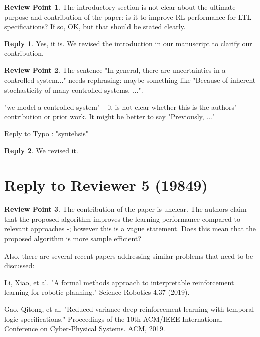 \documentclass[10 pt, dvipdfmx]{article}
\theoremstyle{definition}
\newtheorem{review point}{Review Point}[section]
\newtheorem*{reply}{Reply}
\begin{document}
\begin{review point}
  The introductory section is not clear about the ultimate purpose and
contribution of the paper: is it to improve RL performance for LTL
specifications? If so, OK, but that should be stated clearly.
\end{review point}

\begin{reply}
  Yes, it is. We revised the introduction in our manuscript to clarify our contribution.
\end{reply}

\begin{review point}
  The sentence "In general, there are uncertainties in a controlled
system..." needs rephrasing: maybe something like "Because of inherent
stochasticity of many controlled systems, ...".

"we model a controlled system" -- it is not clear whether this is the
authors' contribution or prior work. It might be better to say
"Previously, ..."

Reply to Typo : "syntehsis"
\end{review point}

\begin{reply}
  We revised it.
\end{reply}

\section{Reply to Reviewer 5 (19849)}

\begin{review point}
  The contribution of the paper is unclear. The authors claim that the
proposed algorithm improves the learning performance compared to
relevant approaches \cite{Hahn2019}-\cite{BWZP2019}; however this is a vague statement. Does
this mean that the proposed algorithm is more sample efficient?

Also, there are several recent papers addressing similar problems that
need to be discussed:

Li, Xiao, et al. "A formal methods approach to interpretable
reinforcement learning for robotic planning." Science Robotics 4.37
(2019).

Gao, Qitong, et al. "Reduced variance deep reinforcement learning with
temporal logic specifications." Proceedings of the 10th ACM/IEEE
International Conference on Cyber-Physical Systems. ACM, 2019.
\end{review point}
\end{document}
